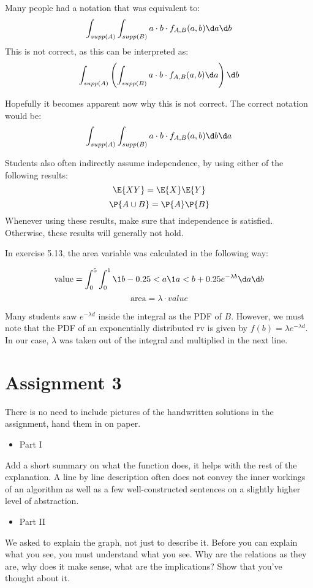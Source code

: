 Many people had a notation that was equivalent to:
$$\int_{supp(A)}\int_{supp(B)} a \cdot b \cdot f_{A,B}(a, b)\d a \d b$$
This is not correct, as this can be interpreted as:
$$\int_{supp(A)} \left ( \int_{supp(B)} a \cdot b \cdot f_{A,B}(a, b)\d a \right )\d b$$

Hopefully it becomes apparent now why this is not correct.
The correct notation would be:
$$\int_{supp(A)}\int_{supp(B)} a \cdot b \cdot f_{A,B}(a, b)\d b \d a$$

Students also often indirectly assume independence, by using either of the following results:
$$ \E{XY} = \E{X}\E{Y}$$
$$ \P{A \cup B} = \P{A} \P{B}$$ Whenever using these results, make
sure that independence is satisfied. Otherwise, these results will
generally not hold.

In exercise 5.13, the area variable was calculated in the following
way:

$$\mathrm{value} = \int_0^5 \int_0^1 \1{b - 0.25 < a} \1{a < b + 0.25} e^{-\lambda b}\d a\d b$$
$$\mathrm{area} = \lambda \cdot value$$

Many students saw $e^{-\lambda d}$ inside the integral as the PDF of
$B$. However, we must note that the PDF of an exponentially
distributed rv is given by $f(b) = \lambda e^{-\lambda d}$. In our
case, $\lambda$ was taken out of the integral and multiplied in the
next line.


\section*{Assignment 3}
There is no need to include pictures of the handwritten solutions in
the assignment, hand them in on paper.

\begin{itemize}
\item Part I
\end{itemize}

Add a short summary on what the function does, it helps with the rest
of the explanation. A line by line description often does not convey
the inner workings of an algorithm as well as a few well-constructed
sentences on a slightly higher level of abstraction.

\begin{itemize}
\item Part II
\end{itemize}

We asked to explain the graph, not just to describe it. Before you can
explain what you see, you must understand what you see. Why are the
relations as they are, why does it make sense, what are the
implications? Show that you've thought about it.

